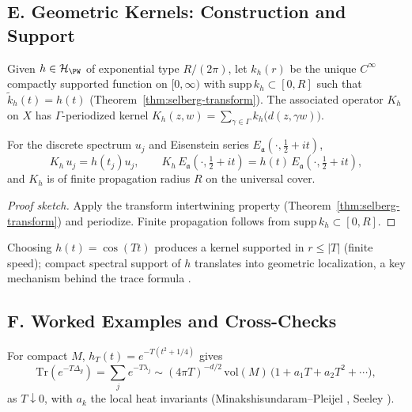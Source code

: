 \subsection*{E. Geometric Kernels: Construction and Support}
\label{subsec:kernels}

\begin{definition}
Given $h\in\mathcal H_{\PW}$ of exponential type $R/(2\pi)$, let $k_h(r)$ be the unique $C^\infty$ compactly supported function on $[0,\infty)$ with $\mathrm{supp}\,k_h\subset[0,R]$ such that $\widetilde k_h(t)=h(t)$ (Theorem~\ref{thm:selberg-transform}). The associated operator $K_h$ on $X$ has $\Gamma$-periodized kernel $K_h(z,w)=\sum_{\gamma\in\Gamma}k_h\big(d(z,\gamma w)\big)$.
\end{definition}

\begin{theorem}
\label{thm:Kh-diagonal}
For the discrete spectrum $u_j$ and Eisenstein series $E_{\mathfrak a}(\cdot,\tfrac12+it)$,
\[
  K_h\,u_j=h(t_j)u_j,\qquad
  K_h\,E_{\mathfrak a}(\cdot,\tfrac12+it)=h(t)\,E_{\mathfrak a}(\cdot,\tfrac12+it),
\]
and $K_h$ is of finite propagation radius $R$ on the universal cover.
\end{theorem}

\begin{proof}[Proof sketch]
Apply the transform intertwining property (Theorem~\ref{thm:selberg-transform}) and periodize. Finite propagation follows from $\mathrm{supp}\,k_h\subset[0,R]$.
\end{proof}

\begin{remark}
Choosing $h(t)=\cos(Tt)$ produces a kernel supported in $r\le |T|$ (finite speed); compact spectral support of $h$ translates into geometric localization, a key mechanism behind the trace formula \cite{Selberg1956,Hejhal1983}.
\end{remark}


\subsection*{F. Worked Examples and Cross-Checks}
\label{subsec:examples-probes}

\begin{example}
For compact $M$, $h_T(t)=e^{-T(t^2+1/4)}$ gives
\[
  \mathrm{Tr}(e^{-T\Delta_g})
  = \sum_j e^{-T\lambda_j}
  \sim (4\pi T)^{-d/2}\,\mathrm{vol}(M)\,\Big(1+a_1 T + a_2 T^2 + \cdots\Big),
\]
as $T\downarrow 0$, with $a_k$ the local heat invariants (Minakshisundaram–Pleijel \cite{Minakshisundaram1949}, Seeley \cite{Seeley1967}).
\end{example}


